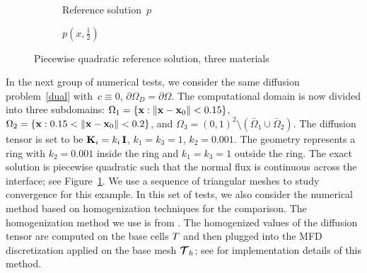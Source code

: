 \begin{figure}[h]
	\centering
	\begin{subfigure}{.45\linewidth}
		\centering
		\caption{Reference solution~$p$}
	\end{subfigure}%
	\hfill
	\begin{subfigure}{.45\linewidth}
		\centering
		\caption{$p(x,\frac{1}{2})$}
	\end{subfigure}
	\caption{Piecewise quadratic reference solution, three materials \label{fig:pwquad3}}
\end{figure}
		
In the next group of numerical tests, we consider the same  diffusion problem~\eqref{dual} with~$c \equiv 0$, $\partial\Omega_D = \partial\Omega$. The computational domain is now divided into three subdomains: $\Omega_1 = \{{\bf x} : \|{\bf x} - {\bf x}_0\| < 0.15\}$, $\Omega_2 = \{{\bf x} : 0.15 < \|{\bf x} - {\bf x}_0\| < 0.2\}$, and $\Omega_3 = (0,1)^2 \setminus (\bar{\Omega}_1\cup\bar{\Omega}_2)$. The diffusion tensor is set to be $\boldsymbol{\mathbf{K}}_i = k_i\,\boldsymbol{\mathbf{I}}$, $k_{1} = k_{3} = 1$, $k_2 = 0.001$. The geometry represents a ring with $k_2=0.001$ inside the ring and $k_{1} = k_{3} = 1$ outside the ring. The exact solution is piecewise quadratic such that the normal flux is continuous across the interface; see Figure~\ref{fig:pwquad3}. We use a sequence of triangular meshes to study convergence for this example. In this set of tests, we also consider the numerical method based on homogenization techniques for the comparison. The homogenization method we use is from \cite{dawes2013solving}. The homogenized values of the diffusion tensor are computed on the base cells $T$ and then plugged into the MFD discretization applied on the  base mesh ${\boldsymbol{\mathbf{\mathcal T}}}_h$; see \cite{kikinzon2017approximate} for implementation details of this method.

